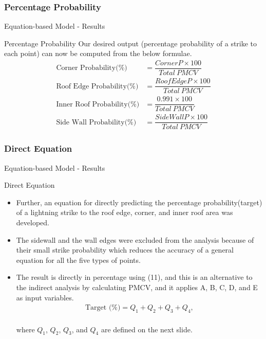 \documentclass{beamer}
\begin{document}
\subsubsection{Percentage Probability}
\begin{frame}{Equation-based Model - Results}
    \begin{block}{Percentage Probability}
        Our desired output (percentage probability of a strike to each point) can now be computed from the below formulae.
        \setlength{\jot}{9pt}
        \begin{align}
            \text{Corner Probability(\%)} &= \dfrac{CornerP\times100}{Total\ PMCV}\\
            \text{Roof Edge Probability(\%)} &= \dfrac{RoofEdgeP\times100}{Total\ PMCV}\\
            \text{Inner Roof Probability(\%)} &= \dfrac{0.991\times100}{Total\ PMCV}\\
            \text{Side Wall Probability(\%)} &= \dfrac{SideWallP\times100}{Total\ PMCV}
        \end{align}
    \end{block}
\end{frame}

\subsubsection{Direct Equation}
\begin{frame}{Equation-based Model - Results}
    \begin{block}{Direct Equation}
    \begin{itemize}\justifying
       \item Further, an equation for directly predicting the percentage probability(target) of a lightning strike to the roof edge, corner, and inner roof area was developed. 
       \item The sidewall and the wall edges were excluded from the analysis because of their small strike probability which reduces the accuracy of a general equation for all the five types of points.
       \item The result is directly in percentage using (11), and this is an alternative to the indirect analysis by calculating PMCV, and it applies A, B, C, D, and E as input variables.\vspace{-2mm}
       \begin{align}
           \text{Target (\%)} = Q_1+Q_2+Q_3+Q_4,
       \end{align}\\\vspace{-3mm}
       where $Q_1$, $Q_2$, $Q_3$, and $Q_4$ are defined on the next slide.
 \end{itemize}
    \end{block}
\end{frame}
\end{document}
